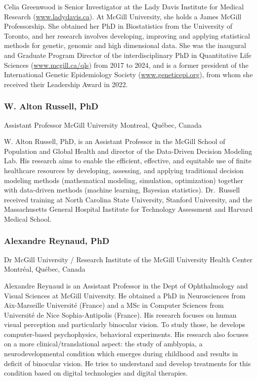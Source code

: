 \documentclass[
]{book}
\begin{document}
Celia Greenwood is Senior Investigator at the Lady Davis Institute for Medical Research (\url{www.ladydavis.ca}). At McGill University, she holds a James McGill Professorship. She obtained her PhD in Biostatistics from the University of Toronto, and her research involves developing, improving and applying statistical methods for genetic, genomic and high dimensional data. She was the inaugural and Graduate Program Director of the interdisciplinary PhD in Quantitative Life Sciences (\url{www.mcgill.ca/qls}) from 2017 to 2024, and is a former president of the International Genetic Epidemiology Society (\url{www.geneticepi.org}), from whom she received their Leadership Award in 2022.

\subsubsection{W. Alton Russell, PhD}\label{w.-alton-russell-phd}

Assistant Professor
McGill University
Montreal, Québec, Canada

W. Alton Russell, PhD, is an Assistant Professor in the McGill School of Population and Global Health and director of the Data-Driven Decision Modeling Lab. His research aims to enable the efficient, effective, and equitable use of finite healthcare resources by developing, assessing, and applying traditional decision modeling methods (mathematical modeling, simulation, optimization) together with data-driven methods (machine learning, Bayesian statistics). Dr.~Russell received training at North Carolina State University, Stanford University, and the Massachusetts General Hospital Institute for Technology Assessment and Harvard Medical School.

\subsubsection{Alexandre Reynaud, PhD}\label{alexandre-reynaud-phd}

Dr
McGill University / Research Institute of the McGill University Health Center
Montréal, Québec, Canada

Alexandre Reynaud is an Assistant Professor in the Dept of Ophthalmology and Visual Sciences at McGill University. He obtained a PhD in Neurosciences from Aix-Marseille Université (France) and a MSc in Computer Sciences from Université de Nice Sophia-Antipolis (France). His research focuses on human visual perception and particularly binocular vision. To study those, he develops computer-based psychophysics, behavioral experiments. His research also focuses on a more clinical/translational aspect: the study of amblyopia, a neurodevelopmental condition which emerges during childhood and results in deficit of binocular vision. He tries to understand and develop treatments for this condition based on digital technologies and digital therapies.
\end{document}
